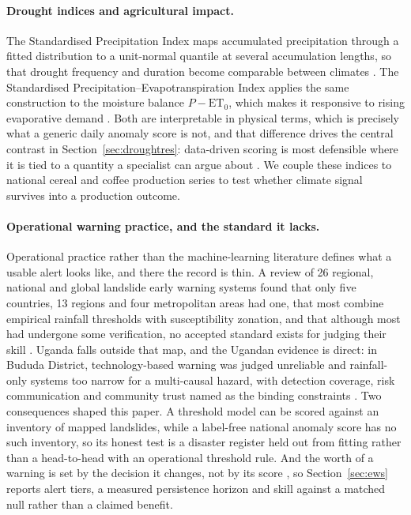\documentclass[preprint,12pt]{elsarticle}
\begin{document}
\paragraph{Drought indices and agricultural impact.}
The Standardised Precipitation Index maps accumulated precipitation through a
fitted distribution to a unit-normal quantile at several accumulation lengths,
so that drought frequency and duration become comparable between climates
\cite{mckee1993}. The Standardised Precipitation--Evapotranspiration Index
applies the same construction to the moisture balance
$P-\mathrm{ET}_0$, which makes it responsive to rising evaporative demand
\cite{vicente2010}. Both are interpretable in physical terms, which is precisely
what a generic daily anomaly score is not, and that difference drives the
central contrast in Section~\ref{sec:droughtres}: data-driven scoring is most
defensible where it is tied to a quantity a specialist can argue about
\cite{reichstein2019}. We couple these indices to national
cereal and coffee production series \cite{worldbank2024,owid2025} to test whether
climate signal survives into a production outcome.

\paragraph{Operational warning practice, and the standard it lacks.}
Operational practice rather than the machine-learning literature defines what a
usable alert looks like, and there the record is thin. A review of 26 regional,
national and global landslide early warning systems found that only five
countries, 13 regions and four metropolitan areas had one, that most combine
empirical rainfall thresholds with susceptibility zonation, and that although
most had undergone some verification, no accepted standard exists for judging
their skill \cite{guzzetti2020}. Uganda falls outside that map, and the Ugandan
evidence is direct: in Bududa District, technology-based warning was judged
unreliable and rainfall-only systems too narrow for a multi-causal hazard, with
detection coverage, risk communication and community trust named as the binding
constraints \cite{namwano2024,namwano2026}. Two consequences shaped this paper.
A threshold model can be scored against an inventory of mapped landslides, while
a label-free national anomaly score has no such inventory, so its honest test is
a disaster register held out from fitting rather than a head-to-head with an
operational threshold rule. And the worth of a warning is set by the decision it
changes, not by its score \cite{thompson1955}, so Section~\ref{sec:ews} reports
alert tiers, a measured persistence horizon and skill against a matched null
rather than a claimed benefit.
\end{document}

